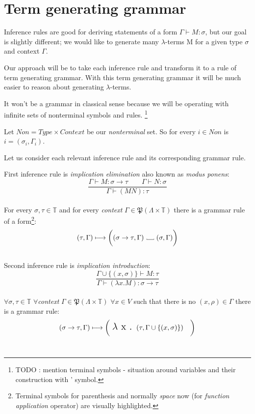 \documentclass[12pt,a4paper]{report}
\newcommand{\Lets}{Let us\xspace}
\newcommand{\lterms}{$\lambda$-terms\xspace}
\newcommand{\turst}[3]{$#1 \vdash #2 : #3$\xspace}
\newcommand{\GMS}{\turst{\Gamma}{M}{\sigma}}
\newcommand\Vtextvisiblespace[1][.3em]{%
  \mbox{\kern.06em\vrule height.3ex}%
  \vbox{\hrule width#1}%
  \hbox{\vrule height.3ex}}
\begin{document}
\section{Term generating grammar}

Inference rules are good for deriving statements of a form \GMS, but our
goal is slightly different; we would like to generate many \lterms M for a given type 
$\sigma$ and context $\Gamma$.

Our approach will be to take each inference rule and transform it to a rule of term generating
grammar. With this term generating grammar it will be much easier to reason about generating 
\lterms.
	
It won't be a grammar in classical sense because we will be operating with infinite sets of
nonterminal symbols and rules. \footnote{TODO : mention terminal symbols - situation around 
variables and their construction with ' symbol.}

Let $Non = Type \times Context $ be our {\it nonterminal} set. 
So for every $i \in Non$ is $i = (\sigma_i , \Gamma_i )$.

\Lets consider each relevant inference rule and its corresponding grammar rule.

First inference rule is {\it implication elimination} also known as 
{\it modus ponens}: 
\[
	\frac{\Gamma \vdash M : \sigma \rightarrow \tau \qquad
		  \Gamma \vdash N : \sigma }
	     {\Gamma \vdash (M N) : \tau }
\]
\\
For every $\sigma, \tau \in \mathbb{T}$ and for every {\it context} 
$\Gamma \in \mathfrak P \left({\Lambda \times  \mathbb{T}}\right)$ there is a grammar rule of a form\footnote{ 
Terminal symbols for parenthesis and normally {\it space} now \textvisiblespace \quad (for {\it function application} operator) are visually highlighted. }: 
\[	
	( \tau , \Gamma )  \longmapsto
	\bigg( ( \sigma \rightarrow \tau , \Gamma ) 
	  \mbox{ \Vtextvisiblespace[1em] } ( \sigma , \Gamma ) \bigg)
\]
\\

Second inference rule is {\it implication introduction}: 
\[
	\frac{\Gamma \cup \{ ( x,\sigma ) \} \vdash M : \tau }
	     {\Gamma \vdash (\lambda x . M) : \sigma \rightarrow \tau }
\]
\\
$\forall \sigma, \tau \in \mathbb{T}$ 
$\forall${\it context} $\Gamma \in \mathfrak P \left({\Lambda \times  \mathbb{T}}\right) $ 
$\forall x \in V $ such that there is no $(x,\rho) \in \Gamma$ 
there is a grammar rule:
\[ 
	( \sigma \rightarrow \tau , \Gamma )  \longmapsto
	\bigg( \mbox{ {\Large $\lambda$ x . }}( \tau , \Gamma \cup \{ (x,\sigma) \} ) \quad \bigg)
\]
\\	
\end{document}
